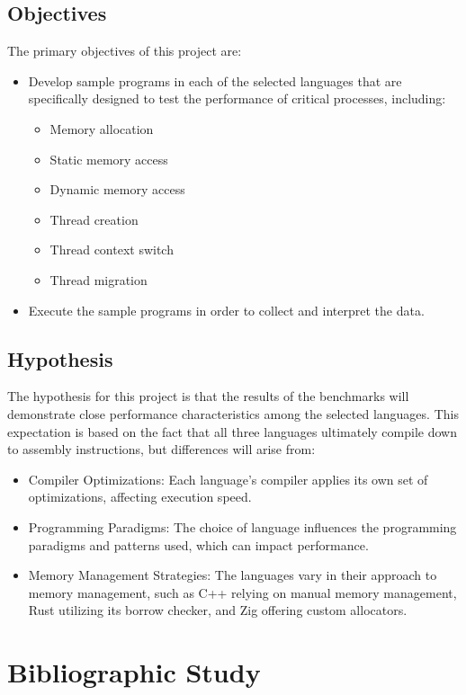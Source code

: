 \documentclass{article}
\begin{document}
\subsection{Objectives}
The primary objectives of this project are:
\begin{itemize}
    \item Develop sample programs in each of the selected languages that are specifically designed to test the performance of critical processes, including:
    \begin{itemize}
        \item Memory allocation
        \item Static memory access
        \item Dynamic memory access
        \item Thread creation
        \item Thread context switch
        \item Thread migration
    \end{itemize}
    \item Execute the sample programs in order to collect and interpret the data.
\end{itemize}

\subsection{Hypothesis}
The hypothesis for this project is that the results of the benchmarks will demonstrate close performance characteristics among the selected languages. This expectation is based on the fact that all three languages ultimately compile down to assembly instructions, but differences will arise from:
\begin{itemize}
    \item Compiler Optimizations: Each language's compiler applies its own set of optimizations, affecting execution speed.
    \item Programming Paradigms: The choice of language influences the programming paradigms and patterns used, which can impact performance.
    \item Memory Management Strategies: The languages vary in their approach to memory management, such as C++ relying on manual memory management, Rust utilizing its borrow checker, and Zig offering custom allocators.
\end{itemize}
\clearpage

\section{Bibliographic Study}
\end{document}
